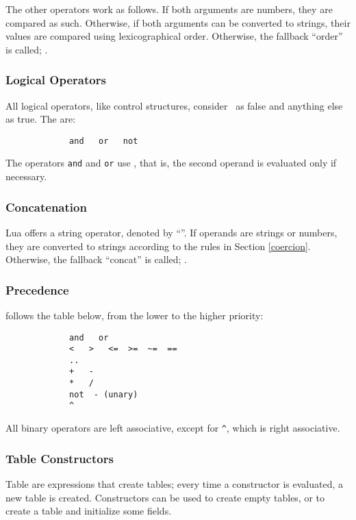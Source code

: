 The other operators work as follows.
If both arguments are numbers, they are compared as such.
Otherwise, if both arguments can be converted to strings,
their values are compared using lexicographical order.
Otherwise, the fallback ``order'' is called; .

\subsubsection{Logical Operators}
All logical operators, like control structures,
consider \nil\ as false and anything else as true.
The  are:
\begin{verbatim}
             and   or   not
\end{verbatim}
The operators \verb'and' and \verb'or' use ,
that is,
the second operand is evaluated only if necessary.

\subsubsection{Concatenation}
Lua offers a string  operator,
denoted by ``''.
If operands are strings or numbers, they are converted to
strings according to the rules in Section \ref{coercion}.
Otherwise, the fallback ``concat'' is called; .

\subsubsection{Precedence}
 follows the table below,
from the lower to the higher priority:
\begin{verbatim}
             and   or
             <   >   <=  >=  ~=  ==
             ..
             +   -
             *   /
             not  - (unary)
             ^
\end{verbatim}
All binary operators are left associative, except for \verb'^',
which is right associative.

\subsubsection{Table Constructors} \label{tableconstructor}
Table  are expressions that create tables;
every time a constructor is evaluated, a new table is created.
Constructors can be used to create empty tables,
or to create a table and initialize some fields.

